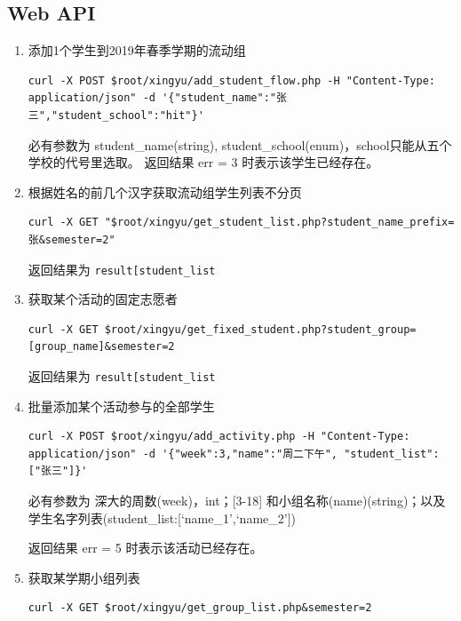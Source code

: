 \documentclass[]{ctexart}
\begin{document}
\subsection{Web API}
\begin{enumerate}
\item  添加1个学生到2019年春季学期的流动组

\begin{lstlisting}
curl -X POST $root/xingyu/add_student_flow.php -H "Content-Type: application/json" -d '{"student_name":"张三","student_school":"hit"}'
\end{lstlisting}

必有参数为 student\_name(string),
student\_school(enum)，school只能从五个学校的代号里选取。 返回结果 err =
3 时表示该学生已经存在。

\item
  根据姓名的前几个汉字获取流动组学生列表不分页

\begin{lstlisting}
curl -X GET "$root/xingyu/get_student_list.php?student_name_prefix=张&semester=2"
\end{lstlisting}

返回结果为
\texttt{result{[}\textquotesingle{}student\_list\textquotesingle{}{]}}

\item
  获取某个活动的固定志愿者

\begin{lstlisting}
curl -X GET $root/xingyu/get_fixed_student.php?student_group=[group_name]&semester=2
\end{lstlisting}

返回结果为
\texttt{result{[}\textquotesingle{}student\_list\textquotesingle{}{]}}

\item
  批量添加某个活动参与的全部学生
\begin{lstlisting}
curl -X POST $root/xingyu/add_activity.php -H "Content-Type: application/json" -d '{"week":3,"name":"周二下午", "student_list":["张三"]}'
\end{lstlisting}

必有参数为 深大的周数(week)，int；{[}3-18{]}
和小组名称(name)(string)；以及学生名字列表(student\_list:{[}`name\_1',`name\_2'{]})

返回结果 err = 5 时表示该活动已经存在。

\item
  获取某学期小组列表
\begin{lstlisting}
curl -X GET $root/xingyu/get_group_list.php&semester=2
\end{lstlisting}


\end{enumerate}
\end{document}
